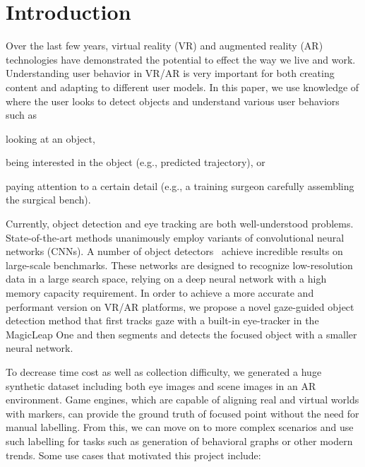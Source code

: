 \section{Introduction}

Over the last few years, virtual reality (VR) and augmented reality (AR)
technologies have demonstrated the potential to effect the way we live and work.
Understanding user behavior in VR/AR is very important for both creating
content and adapting to different user models. In this paper, we use
knowledge of where the user looks to detect objects and
understand various user behaviors such as
\begin{inlist}
\item looking at an object,
\item being interested in the object (e.g., predicted trajectory), or
\item
    paying attention to a certain detail (e.g., a training surgeon carefully
    assembling the surgical bench).
\end{inlist}

Currently, object detection and eye tracking are both well-understood problems.
State-of-the-art methods unanimously employ variants of convolutional neural
networks (CNNs). A number of object detectors~\cite{redmon2016you, liu2016ssd,
lin2017focal, girshick2014rich, girshick2015fast, ren2015faster, he2017mask}
achieve incredible results on large-scale benchmarks. These networks are
designed to recognize low-resolution data in a large search space, relying on a
deep neural network with a high memory capacity requirement. In order to achieve
a more accurate and performant version on VR/AR platforms, we propose a novel
gaze-guided object detection method that first tracks gaze with a built-in
eye-tracker in the MagicLeap One and then segments and detects the focused object with a
smaller neural network.

To decrease time cost as well as collection difficulty, we generated a huge
synthetic dataset including both eye images and scene images in an AR
environment. Game engines, which are capable of aligning real and virtual worlds
with markers, can provide the ground truth of focused point without the need for
manual labelling. From this, we can move on to more complex scenarios and use
such labelling for tasks such as generation of behavioral graphs or other
modern trends. Some use cases that motivated this project include:

